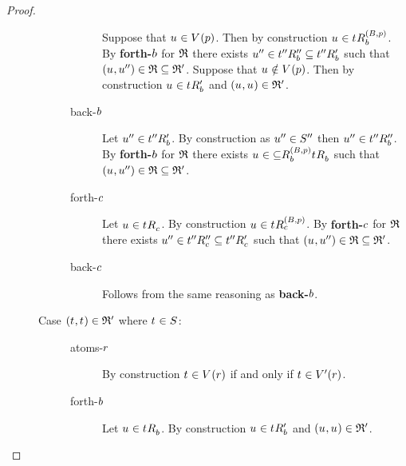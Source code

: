 \begin{proof}
\begin{description}
\begin{description}
\begin{description}
                        Suppose that $\kStateU \in \kValuation(\atomP)$.
                        Then by construction $\kStateU \in \kSuccessorsB[(\agentsB, \atomP)]{\kStateT}$.
                        By {\bf forth-$b$} for $\mathfrak{R}$ there exists ${u}^{\prime\prime} \in {{t}^{\prime\prime}} {R^{\prime\prime}_{b}} \subseteq {{t}^{\prime\prime}} {R^{\prime}_{b}}$ such that $(\kStateU, \kStateUPP) \in \bisimulation \subseteq \bisimulation'$.
                        Suppose that $\kStateU \notin \kValuation(\atomP)$.
                        Then by construction $\kStateU \in \kSuccessorsPB{\kStateT}$ and $(\kStateU, \kStateU) \in \bisimulation'$.
                    \item[back-$b$]
                        Let ${u}^{\prime\prime} \in {{t}^{\prime\prime}} {R^{\prime}_{b}}$.
                        By construction as ${u}^{\prime\prime} \in {S^{\prime\prime}}$ then ${u}^{\prime\prime} \in {{t}^{\prime\prime}} {R^{\prime\prime}_{b}}$.
                        By {\bf forth-$b$} for $\mathfrak{R}$ there exists $\kStateU \in \kSuccessorsB[(\agentsB, \atomP)] \subseteq \kSuccessorsB{\kStateT}$ such that $(\kStateU, \kStateUPP) \in \bisimulation \subseteq \bisimulation'$.
                    \item[forth-$c$]
                        Let $\kStateU \in \kSuccessorsC{\kStateT}$.
                        By construction $\kStateU \in \kSuccessorsC[(\agentsB, \atomP)]{\kStateT}$.
                        By {\bf forth-$c$} for $\mathfrak{R}$ there exists ${u}^{\prime\prime} \in {{t}^{\prime\prime}} {R^{\prime\prime}_{c}} \subseteq {{t}^{\prime\prime}} {R^{\prime}_{c}}$ such that $(\kStateU, \kStateUPP) \in \bisimulation \subseteq \bisimulation'$.
                    \item[back-$c$]
                        Follows from the same reasoning as {\bf back-$b$}.
                \end{description}
            \item[{Case $(\kStateT, \kStateT) \in \bisimulation'$ where $\kStateT \in \kStates$:}]
                \hfill
                \begin{description}
                    \item[atoms-$r$] 
                        By construction $\kStateT \in \kValuation(\atomR)$ if and only if $\kStateT \in \kValuationP(\atomR)$.
                    \item[forth-$b$]
                        Let $\kStateU \in \kSuccessorsB{\kStateT}$.
                        By construction $\kStateU \in \kSuccessorsPB{\kStateT}$ and $(\kStateU, \kStateU) \in \bisimulation'$.

\end{description}
\end{description}
\end{description}
\end{proof}
